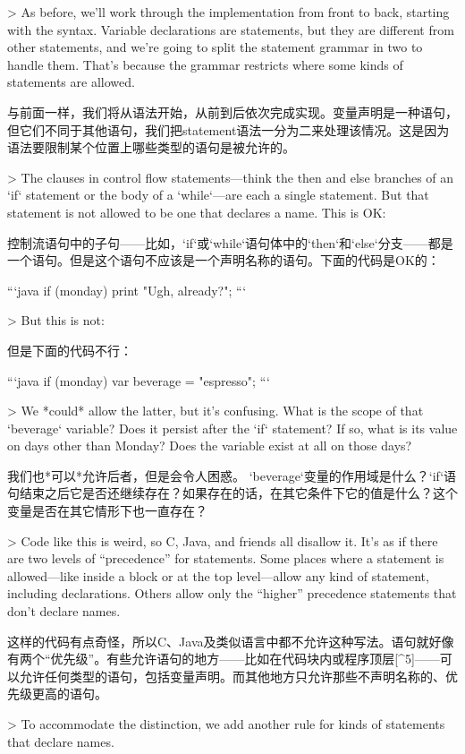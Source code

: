 \documentclass[cn,11pt,chinese]{elegantbook}
\begin{document}
{{{> As before, we’ll work through the implementation from front to back, starting with the syntax. Variable declarations are statements, but they are different from other statements, and we’re going to split the statement grammar in two to handle them. That’s because the grammar restricts where some kinds of statements are allowed.

与前面一样，我们将从语法开始，从前到后依次完成实现。变量声明是一种语句，但它们不同于其他语句，我们把statement语法一分为二来处理该情况。这是因为语法要限制某个位置上哪些类型的语句是被允许的。

> The clauses in control flow statements—think the then and else branches of an `if` statement or the body of a `while`—are each a single statement. But that statement is not allowed to be one that declares a name. This is OK:

控制流语句中的子句——比如，`if`或`while`语句体中的`then`和`else`分支——都是一个语句。但是这个语句不应该是一个声明名称的语句。下面的代码是OK的：

```java
if (monday) print "Ugh, already?";
```

> But this is not:

但是下面的代码不行：

```java
if (monday) var beverage = "espresso";
```

> We *could* allow the latter, but it’s confusing. What is the scope of that `beverage` variable? Does it persist after the `if` statement? If so, what is its value on days other than Monday? Does the variable exist at all on those days?

我们也*可以*允许后者，但是会令人困惑。 `beverage`变量的作用域是什么？`if`语句结束之后它是否还继续存在？如果存在的话，在其它条件下它的值是什么？这个变量是否在其它情形下也一直存在？

> Code like this is weird, so C, Java, and friends all disallow it. It’s as if there are two levels of “precedence” for statements. Some places where a statement is allowed—like inside a block or at the top level—allow any kind of statement, including declarations. Others allow only the “higher” precedence statements that don’t declare names.

这样的代码有点奇怪，所以C、Java及类似语言中都不允许这种写法。语句就好像有两个“优先级”。有些允许语句的地方——比如在代码块内或程序顶层[^5]——可以允许任何类型的语句，包括变量声明。而其他地方只允许那些不声明名称的、优先级更高的语句。

> To accommodate the distinction, we add another rule for kinds of statements that declare names.

}}}
\end{document}
